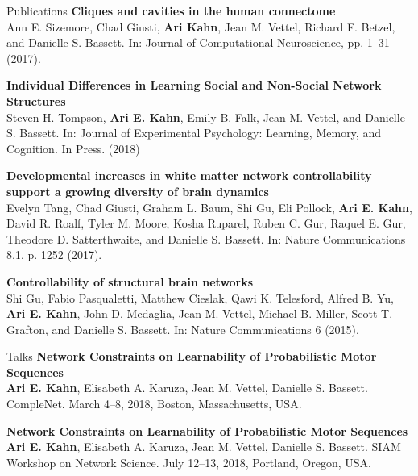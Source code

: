 \documentclass{resume} %
\begin{document}
\begin{rSection}{Publications}
\textbf{Cliques and cavities in the human connectome} \\
Ann E. Sizemore, Chad Giusti, \textbf{Ari Kahn}, Jean M. Vettel, Richard F. Betzel, and Danielle S. Bassett. In: Journal of Computational Neuroscience, pp. 1–31 (2017).

\textbf{Individual Differences in Learning Social and Non-Social Network Structures} \\
Steven H. Tompson, \textbf{Ari E. Kahn}, Emily B. Falk, Jean M. Vettel, and Danielle S. Bassett. In: Journal of Experimental Psychology: Learning, Memory, and Cognition. In Press. (2018)

\textbf{Developmental increases in white matter network controllability support a growing diversity of brain dynamics} \\
Evelyn Tang, Chad Giusti, Graham L. Baum, Shi Gu, Eli Pollock, \textbf{Ari E. Kahn}, David R. Roalf, Tyler M. Moore, Kosha Ruparel, Ruben C. Gur, Raquel E. Gur, Theodore D. Satterthwaite, and Danielle S. Bassett. In: Nature Communications 8.1, p. 1252 (2017).



\textbf{Controllability of structural brain networks} \\
Shi Gu, Fabio Pasqualetti, Matthew Cieslak, Qawi K. Telesford, Alfred B. Yu, \textbf{Ari E. Kahn}, John D. Medaglia, Jean M. Vettel, Michael B. Miller, Scott T. Grafton, and Danielle S. Bassett. In: Nature Communications 6 (2015).

\end{rSection}


\begin{rSection}{Talks}
\textbf{Network Constraints on Learnability of Probabilistic Motor Sequences} \\
\textbf{Ari E. Kahn}, Elisabeth A. Karuza, Jean M. Vettel, Danielle S. Bassett. CompleNet. March 4--8, 2018, Boston, Massachusetts, USA.

\textbf{Network Constraints on Learnability of Probabilistic Motor Sequences} \\
\textbf{Ari E. Kahn}, Elisabeth A. Karuza, Jean M. Vettel, Danielle S. Bassett. SIAM Workshop on Network Science. July 12--13, 2018, Portland, Oregon, USA.
\end{rSection}
\end{document}
